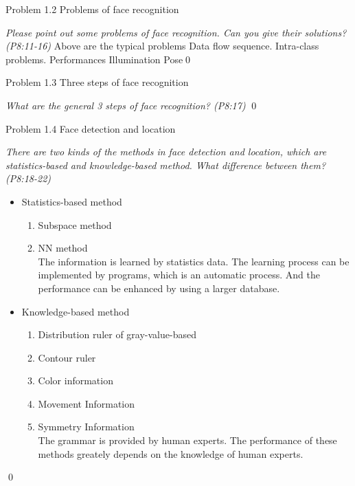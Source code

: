 \documentclass[
        ]{beamer}
\begin{document}
\begin{frame}[t]{Problem 1.2 Problems of face recognition}    		
	\begin{overprint}
	\emph{Please point out some problems of face recognition. Can you give their solutions? (P8:11-16)}
	\onslide<2> 
	Above are the typical problems
	\onslide<3> 
	Data flow sequence.
	\onslide<4> 
	Intra-class problems.
	\onslide<5> 
	Performances
	\onslide<6> 
	Illumination
	\onslide<7> 
	Pose\qed		
	\end{overprint}
\end{frame}

\begin{frame}[t]{Problem 1.3 Three steps of face recognition}    		
	\begin{overprint}
	\onslide<1>
	\emph{What are the general 3 steps of face recognition? (P8:17)}
	\onslide<2>  \qed		
	\end{overprint}
\end{frame}

\begin{frame}[t]{Problem 1.4 Face detection and location}    		
	\begin{overprint}
	\emph{There are two kinds of the methods in face detection and location, which are statistics-based and knowledge-based method. What difference between them? (P8:18-22)}
	\onslide<2> \inpdfc{8}{18}
	\onslide<3> \inpdfc{8}{19}
	\onslide<4> \inpdfc{8}{20}
	\onslide<5> \inpdfc{8}{21}
	\onslide<6> \inpdfc{8}{22}
		\begin{itemize}
			\item Statistics-based method
			\begin{enumerate}
				\item Subspace method
				\item NN method\\
				\alert{The information is learned by statistics data. The learning process can be implemented by programs, which is an automatic process. And the performance can be enhanced by using a larger database.}
				\end{enumerate}
				\item Knowledge-based method
			\begin{enumerate}
					\item Distribution ruler of gray-value-based
					\item Contour ruler
					\item Color information
					\item Movement Information
					\item Symmetry Information	\\
				\alert{The grammar is provided by human experts. The performance of these methods greately depends on the knowledge of human experts.}
				\end{enumerate}
		\end{itemize}		
	\qed		
	\end{overprint}
\end{frame}
\end{document}
